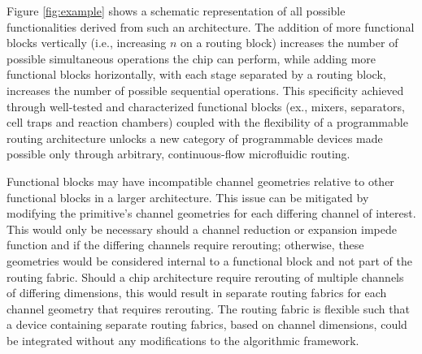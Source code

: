 	Figure \ref{fig:example} shows a schematic representation of all possible functionalities derived from such an architecture. The addition of more functional blocks vertically (i.e., increasing $n$ on a routing block) increases the number of possible simultaneous operations the chip can perform, while adding more functional blocks horizontally, with each stage separated by a routing block, increases the number of possible sequential operations. This specificity achieved through well-tested and characterized functional blocks (ex., mixers, separators, cell traps and reaction chambers) coupled with the flexibility of a programmable routing architecture unlocks a new category of programmable devices made possible only through arbitrary, continuous-flow microfluidic routing. 


Functional blocks may have incompatible channel geometries relative to other functional blocks in a larger architecture. This issue can be mitigated by modifying the primitive's channel geometries for each differing channel of interest. This would only be necessary should a channel reduction or expansion impede function and if the differing channels require rerouting; otherwise, these geometries would be considered internal to a functional block and not part of the routing fabric. Should a chip architecture require rerouting of multiple channels of differing dimensions, this would result in separate routing fabrics for each channel geometry that requires rerouting. The routing fabric is flexible such that a device containing separate routing fabrics, based on channel dimensions, could be integrated without any modifications to the algorithmic framework.

